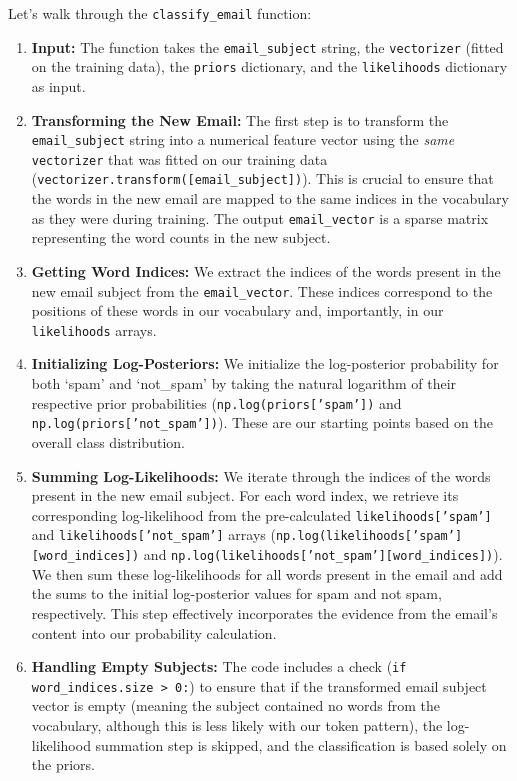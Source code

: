 \documentclass[12pt,letterpaper]{article}
\begin{document}
Let's walk through the \texttt{classify\_email} function:

\begin{enumerate}
    \item \textbf{Input:} The function takes the \texttt{email\_subject} string, the \texttt{vectorizer} (fitted on the training data), the \texttt{priors} dictionary, and the \texttt{likelihoods} dictionary as input.
    
    \item \textbf{Transforming the New Email:} The first step is to transform the \texttt{email\_subject} string into a numerical feature vector using the \textit{same} \texttt{vectorizer} that was fitted on our training data (\texttt{vectorizer.transform([email\_subject])}). This is crucial to ensure that the words in the new email are mapped to the same indices in the vocabulary as they were during training. The output \texttt{email\_vector} is a sparse matrix representing the word counts in the new subject.
    
    \item \textbf{Getting Word Indices:} We extract the indices of the words present in the new email subject from the \texttt{email\_vector}. These indices correspond to the positions of these words in our vocabulary and, importantly, in our \texttt{likelihoods} arrays.
    
    \item \textbf{Initializing Log-Posteriors:} We initialize the log-posterior probability for both `spam' and `not\_spam' by taking the natural logarithm of their respective prior probabilities (\texttt{np.log(priors['spam'])} and \texttt{np.log(priors['not\_spam'])}). These are our starting points based on the overall class distribution.
    
    \item \textbf{Summing Log-Likelihoods:} We iterate through the indices of the words present in the new email subject. For each word index, we retrieve its corresponding log-likelihood from the pre-calculated \texttt{likelihoods['spam']} and \texttt{likelihoods['not\_spam']} arrays (\texttt{np.log(likelihoods['spam'][word\_indices])} and \texttt{np.log(likelihoods['not\_spam'][word\_indices])}). We then sum these log-likelihoods for all words present in the email and add the sums to the initial log-posterior values for spam and not spam, respectively. This step effectively incorporates the evidence from the email's content into our probability calculation.
    
    \item \textbf{Handling Empty Subjects:} The code includes a check (\texttt{if word\_indices.size > 0:}) to ensure that if the transformed email subject vector is empty (meaning the subject contained no words from the vocabulary, although this is less likely with our token pattern), the log-likelihood summation step is skipped, and the classification is based solely on the priors.
    

\end{enumerate}
\end{document}
